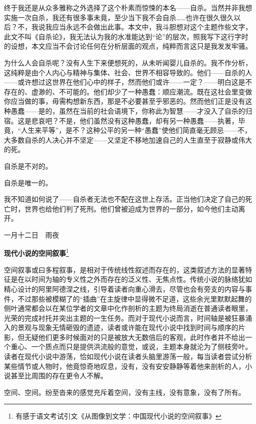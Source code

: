 \documentclass{ctexbook}
\begin{document}
    终于我还是从众多雅称之外选择了这个朴素而惊悚的本名——自杀。当然并非我想实施一次自杀，我还有很多事未竟，至少当下我不会自杀……也许在很久很久以后？不，我说我应当永远不会做出此事。本文中，我斗胆想对这个主题作些文字，此文不叫《自杀论》，我无法认为我的水准能达到“论”的层次，照我写下这行字时的设想，本文应当不会讨论任何在分析层面的观点，纯粹而言这只是我发发牢骚。

    为什么人会自杀呢？没有人生下来便想死的，从未听闻婴儿自杀的。我不作分析，这纯粹是由个人内心与精神与集体、社会、世界不相容导致的。他们——自杀的人——或许想过这世界在他们心中的样子，然而他们或许——一定？——明白这是不存在的、虚渺的、不可能的。他们却少了一种愚蠢：顺应潮流。既在这社会里变做你应当做的事，毋需构想新东西，那是不必要甚至乎邪恶的。然而他们正是没有这种愚蠢——是的，虽然在当前的社会语境下，你称此为智慧——才没入了自杀的归宿。这是悲哀吧？不是，他们虽然没有这种愚蠢，却有另一种愚蠢——执著，毕竟，“人生来平等”，是不？这种公平的另一种“愚蠢”使他们简直毫无顾忌——不，大多数自杀的人决心并不坚定——又坚定不移地加速自己的人生直至于寂静或伟大的死。

    自杀是不对的。

    自杀是唯一的。

    我不知道如何说了——自杀者无法也不配在这世上存活。正当他们决定了自己的死亡时，世界也给他们判了死刑。他们曾被迫成为世界的一部分，如今他们主动离开。


\mbox


    \hfill 一月十二日\ \ 雨夜

\newpage
\textbf{现代小说的空间叙事}\footnote{\normalsize 有感于语文考试引文《从图像到文学：中国现代小说的空间叙事》}


\mbox


    空间叙事或曰多程叙事，是相对于传统线性叙述而存在的，这类叙述方法的显著特征是在以时间为轴的专义性之外而存在的泛义性、无焦点性。传统小说的脉络犹如精心设计的阿里阿德涅之线，引导着读者向重心滑去，尽管也会有旁支的内容与事件，不过那些被模糊了的“插曲”在主旋律中显得微不足道，这些余光里默默起舞的侧叶通常都会以在某位学者的文章中化作剖析的主题为终局消逝在普通读者眼里，光荣的完成衬托并突出主题的一生任务。而对于现代小说而言，时间轴是被狂暴涌入的景观与现象无情砸毁的遗迹，读者或许能在现代小说中找到时间与顺序的片影，但无疑他们更多时候面对的只是被放大无数倍后的客观，此时作者并不给出一个重心、一个质点而只是提供洪流般的意觉，或说，主题本身就沦为了侧枝旁叶。读者在现代小说中游荡，恰如现代小说在读者头脑里游荡一般，每当读者尝试分析某些情节或人物时，他竟惊奇地叹息，没有，没有安安静静等着他来剖析的人，小说甚至比周围的存在更令人不解。

    空间、空间。纷至沓来的感觉充斥着空间，没有主线，没有意象，没有了所有。
\end{document}
